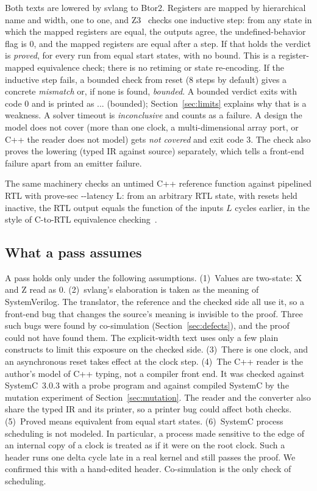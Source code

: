 \documentclass[conference]{IEEEtran}
\newcommand{\code}[1]{{\fontshape{n}\ttfamily #1}}
\begin{document}
Both texts are lowered by \code{svlang} to Btor2. Registers are mapped by hierarchical name and
width, one to one, and Z3~\cite{demoura2008z3} checks one inductive step: from any state in which
the mapped registers are equal, the outputs agree, the undefined-behavior flag is 0, and the mapped
registers are equal after a step. If that holds the verdict is \emph{proved}, for every run from
equal start states, with no bound. This is a register-mapped equivalence check; there is no
retiming or state re-encoding. If the inductive step fails, a bounded check from reset (8 steps by
default) gives a concrete \emph{mismatch} or, if none is found, \emph{bounded}. A bounded verdict
exits with code 0 and is printed as \code{[PASS] ... (bounded)}; Section~\ref{sec:limits} explains
why that is a weakness. A solver timeout is \emph{inconclusive} and counts as a failure. A design
the model does not cover (more than one clock, a multi-dimensional array port, or C++ the reader
does not model) gets \emph{not covered} and exit code 3. The check also proves the lowering (typed
IR against source) separately, which tells a front-end failure apart from an emitter failure.

The same machinery checks an untimed C++ reference function against pipelined RTL with
\code{prove-sec -{}-latency L}: from an arbitrary RTL state, with resets held inactive, the RTL output
equals the function of the inputs $L$ cycles earlier, in the style of C-to-RTL equivalence
checking~\cite{koelbl2009c2rtl}.

\subsection{What a pass assumes}
\label{sec:assume}

A pass holds only under the following assumptions.
(1)~Values are two-state: X and Z read as 0.
(2)~\code{svlang}'s elaboration is taken as the meaning of SystemVerilog. The translator, the
reference and the checked side all use it, so a front-end bug that changes the source's meaning is
invisible to the proof. Three such bugs were found by co-simulation (Section~\ref{sec:defects}),
and the proof could not have found them. The explicit-width text uses only a few plain constructs
to limit this exposure on the checked side.
(3)~There is one clock, and an asynchronous reset takes effect at the clock step.
(4)~The C++ reader is the author's model of C++ typing, not a compiler front end. It was checked
against SystemC~3.0.3 with a probe program and against compiled SystemC by the mutation experiment
of Section~\ref{sec:mutation}. The reader and the converter also share the typed IR and its printer,
so a printer bug could affect both checks.
(5)~Proved means equivalent from equal start states.
(6)~SystemC process scheduling is not modeled. In particular, a process made sensitive to the edge
of an internal copy of a clock is treated as if it were on the root clock. Such a header runs one
delta cycle late in a real kernel and still passes the proof. We confirmed this with a hand-edited
header. Co-simulation is the only check of scheduling.
\end{document}
